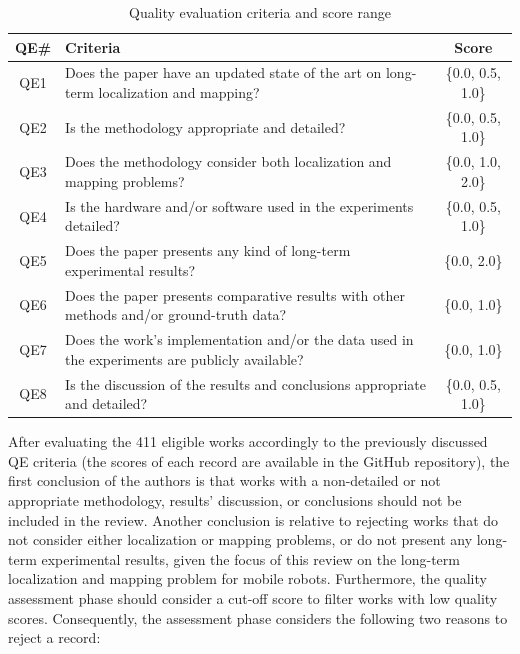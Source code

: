 \documentclass[10pt,a4paper,notitlepage,twocolumn,oneside]{article}
\begin{document}
\begin{table}[h]
  \renewcommand{\arraystretch}{1.25}
  \setlength{\tabcolsep}{3pt}
  \caption[Quality evaluation criteria and score range]{Quality evaluation criteria and score range}
  \vspace{0.5em}
  \label{tab:methodology:quality-assessment}
  \centering
  {\scriptsize
  \begin{tabular}{c m{} c}

\hline
\textbf{QE\#} & \textbf{Criteria} & \textbf{Score}\\
\hline
QE1 &
Does the paper have an updated state of the art on long-term localization and mapping? &
\{0.0, 0.5, 1.0\}\\
\hline
QE2 &
Is the methodology appropriate and detailed? &
\{0.0, 0.5, 1.0\}\\
\hline
QE3 &
Does the methodology consider both localization and mapping problems? &
\{0.0, 1.0, 2.0\}\\
\hline
QE4 &
Is the hardware and/or software used in the experiments detailed? &
\{0.0, 0.5, 1.0\}\\
\hline
QE5 &
Does the paper presents any kind of long-term experimental results? &
\{0.0, 2.0\}\\
\hline
QE6 &
Does the paper presents comparative results with other methods and/or ground-truth data? &
\{0.0, 1.0\}\\
\hline
QE7 &
Does the work's implementation and/or the data used in the experiments are publicly available? &
\{0.0, 1.0\}\\
\hline
QE8 &
Is the discussion of the results and conclusions appropriate and detailed? &
\{0.0, 0.5, 1.0\}\\
\hline

  \end{tabular}}
\end{table}

After evaluating the 411 eligible works accordingly to the previously discussed QE criteria (the scores of each record are available in the GitHub repository), the first conclusion of the authors is that works with a non-detailed or not appropriate methodology, results' discussion, or conclusions should not be included in the review. Another conclusion is relative to rejecting works that do not consider either localization or mapping problems, or do not present any long-term experimental results, given the focus of this review on the long-term localization and mapping problem for mobile robots. Furthermore, the quality assessment phase should consider a cut-off score to filter works with low quality scores. Consequently, the assessment phase considers the following two reasons to reject a record:
\end{document}
